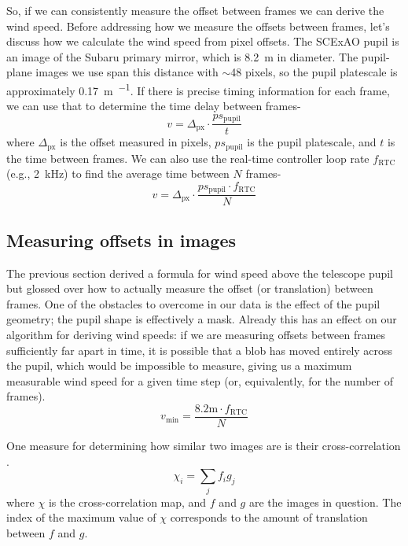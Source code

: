 So, if we can consistently measure the offset between frames we can derive the wind speed. Before addressing how we measure the offsets between frames, let's discuss how we calculate the wind speed from pixel offsets. The SCExAO pupil is an image of the Subaru primary mirror, which is \SI{8.2}{\meter} in diameter. The pupil-plane images we use span this distance with $\sim$48 pixels, so the pupil platescale is approximately \SI{0.17}{\meter\per\pixel}. If there is precise timing information for each frame, we can use that to determine the time delay between frames-
\begin{equation}
    v = \Delta_\mathrm{px} \cdot \frac{ps_\mathrm{pupil}}{t}
\end{equation}
where $\Delta_\mathrm{px}$ is the offset measured in pixels, $ps_\mathrm{pupil}$ is the pupil platescale, and $t$ is the time between frames. We can also use the real-time controller loop rate $f_\mathrm{RTC}$ (e.g., \SI{2}{\kilo\hertz}) to find the average time between $N$ frames-
\begin{equation}
    v = \Delta_\mathrm{px} \cdot \frac{ps_\mathrm{pupil} \cdot f_\mathrm{RTC}}{N}
    \label{eqn:quantity}
\end{equation}

\subsection{Measuring offsets in images} \label{sec:algo}

The previous section derived a formula for wind speed above the telescope pupil but glossed over how to actually measure the offset (or translation) between frames. One of the obstacles to overcome in our data is the effect of the pupil geometry; the pupil shape is effectively a mask. Already this has an effect on our algorithm for deriving wind speeds: if we are measuring offsets between frames sufficiently far apart in time, it is possible that a blob has moved entirely across the pupil, which would be impossible to measure, giving us a maximum measurable wind speed for a given time step (or, equivalently, for the number of frames).
\begin{equation}
    v_\mathrm{min} = \frac{8.2\mathrm{ m} \cdot f_\mathrm{RTC}}{N}
    \label{eqn:max}
\end{equation}

One measure for determining how similar two images are is their cross-correlation \citep{1997ApOpt..36.8352F}.
\begin{equation}
    \chi_{i} = \sum_{j}{f_{i}g_{j}}
    \label{eqn:crosscorr}
\end{equation}
where $\chi$ is the cross-correlation map, and $f$ and $g$ are the images in question. The index of the maximum value of $\chi$ corresponds to the amount of translation between $f$ and $g$. 


